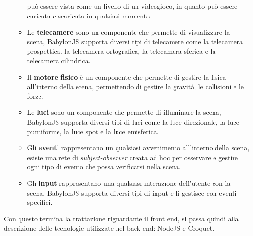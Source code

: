 \begin{itemize}
\begin{itemize}
        può essere vista come un livello di un videogioco, in quanto può essere caricata e scaricata in qualsiasi momento.
        \item Le \textbf{telecamere} sono un componente che permette di visualizzare la scena, BabylonJS supporta diversi tipi di telecamere come la telecamera prospettica, la telecamera ortografica,
        la telecamera sferica e la telecamera cilindrica.
        \item Il \textbf{motore fisico} è un componente che permette di gestire la fisica all'interno della scena, permettendo di gestire la gravità, le collisioni e le forze.
        \item Le \textbf{luci} sono un componente che permette di illuminare la scena, BabylonJS supporta diversi tipi di luci come la luce direzionale, la luce puntiforme, la luce spot e la luce
        emisferica.
        \item Gli \textbf{eventi} rappresentano un qualsiasi avvenimento all'interno della scena, esiste una rete di \textit{subject-observer} creata ad hoc per osservare e gestire ogni tipo
        di evento che possa verificarsi nella scena.
        \item Gli \textbf{input} rappresentano una qualsiasi interazione dell'utente con la scena, BabylonJS supporta diversi tipi di input e li gestisce con eventi specifici.
    \end{itemize}
\end{itemize}
Con questo termina la trattazione riguardante il front end, si passa quindi alla descrizione delle tecnologie utilizzate nel back end: NodeJS e Croquet.

